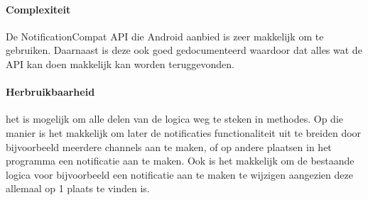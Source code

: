 \paragraph{Complexiteit}
De NotificationCompat API die Android aanbied is zeer makkelijk om te gebruiken. 
Daarnaast is deze ook goed gedocumenteerd waardoor dat alles wat de API kan doen 
makkelijk kan worden teruggevonden.  

\paragraph{Herbruikbaarheid}
het is mogelijk om alle delen van de logica weg te steken in methodes. Op die manier 
is het makkelijk om later de notificaties functionaliteit uit te breiden door bijvoorbeeld meerdere channels aan te maken, 
of op andere plaatsen in het programma een notificatie aan te maken. Ook is het makkelijk om de bestaande logica voor 
bijvoorbeeld een notificatie aan te maken te wijzigen aangezien deze allemaal op 1 plaats te vinden is.